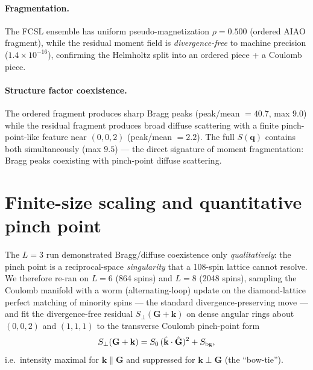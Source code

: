 \documentclass[11pt]{article}
\begin{document}
\paragraph{Fragmentation.} The FCSL ensemble has uniform pseudo-magnetization
$\rho=0.500$ (ordered AIAO fragment), while the residual moment field is
\emph{divergence-free} to machine precision ($1.4\times10^{-16}$), confirming the
Helmholtz split into an ordered piece + a Coulomb piece.

\paragraph{Structure factor coexistence.} The ordered fragment produces sharp Bragg
peaks (peak/mean $=40.7$, max $9.0$) while the residual fragment produces broad diffuse
scattering with a finite pinch-point-like feature near $(0,0,2)$ (peak/mean $=2.2$).
The full $S(\mathbf q)$ contains both simultaneously (max $9.5$) --- the direct signature
of moment fragmentation: Bragg peaks coexisting with pinch-point diffuse scattering.

\section{Finite-size scaling and quantitative pinch point}
The $L=3$ run demonstrated Bragg/diffuse coexistence only \emph{qualitatively}: the
pinch point is a reciprocal-space \emph{singularity} that a 108-spin lattice cannot
resolve. We therefore re-ran on $L=6$ (864 spins) and $L=8$ (2048 spins), sampling the
Coulomb manifold with a worm (alternating-loop) update on the diamond-lattice perfect
matching of minority spins --- the standard divergence-preserving move --- and fit the
divergence-free residual $S_\perp(\mathbf G+\mathbf k)$ on dense angular rings about
$(0,0,2)$ and $(1,1,1)$ to the transverse Coulomb pinch-point form
\begin{equation}
S_\perp(\mathbf G+\mathbf k)=S_0\,(\hat{\mathbf k}\cdot\hat{\mathbf G})^2+S_{\rm bg},
\end{equation}
i.e.\ intensity maximal for $\mathbf k\parallel\mathbf G$ and suppressed for
$\mathbf k\perp\mathbf G$ (the ``bow-tie'').
\end{document}
